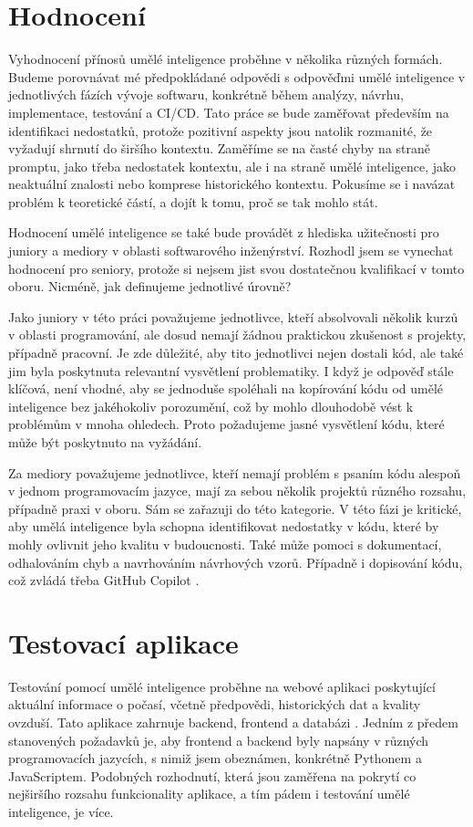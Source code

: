 \documentclass[FM,DP]{tulthesis}
\begin{document}
		\section{Hodnocení}
		Vyhodnocení přínosů umělé inteligence proběhne v několika různých formách. Budeme porovnávat mé předpokládané odpovědi s odpověďmi umělé inteligence v jednotlivých fázích vývoje softwaru, konkrétně během analýzy, návrhu, implementace, testování a CI/CD. Tato práce se bude zaměřovat především na identifikaci nedostatků, protože pozitivní aspekty jsou natolik rozmanité, že vyžadují shrnutí do širšího kontextu. Zaměříme se na časté chyby na straně promptu, jako třeba nedostatek kontextu, ale i na straně umělé inteligence, jako neaktuální znalosti nebo komprese historického kontextu. Pokusíme se i navázat problém k teoretické částí, a dojít k tomu, proč se tak mohlo stát.
		
		Hodnocení umělé inteligence se také bude provádět z hlediska užitečnosti pro juniory a mediory v oblasti softwarového inženýrství. Rozhodl jsem se vynechat hodnocení pro seniory, protože si nejsem jist svou dostatečnou kvalifikací v tomto oboru. Nicméně, jak definujeme jednotlivé úrovně?
		
		Jako juniory v této práci považujeme jednotlivce, kteří absolvovali několik kurzů v oblasti programování, ale dosud nemají žádnou praktickou zkušenost s projekty, případně pracovní. Je zde důležité, aby tito jednotlivci nejen dostali kód, ale také jim byla poskytnuta relevantní vysvětlení problematiky. I když je odpověď stále klíčová, není vhodné, aby se jednoduše spoléhali na kopírování kódu od umělé inteligence bez jakéhokoliv porozumění, což by mohlo dlouhodobě vést k problémům v mnoha ohledech. Proto požadujeme jasné vysvětlení kódu, které může být poskytnuto na vyžádání.
		
		Za mediory považujeme jednotlivce, kteří nemají problém s psaním kódu alespoň v jednom programovacím jazyce, mají za sebou několik projektů různého rozsahu, případně praxi v oboru. Sám se zařazuji do této kategorie. V této fázi je kritické, aby umělá inteligence byla schopna identifikovat nedostatky v kódu, které by mohly ovlivnit jeho kvalitu v budoucnosti. Také může pomoci s dokumentací, odhalováním chyb a navrhováním návrhových vzorů. Případně i  dopisování kódu, což zvládá třeba GitHub Copilot \cite{gitCopilot}.
		
		\section{Testovací aplikace}
		Testování pomocí umělé inteligence proběhne na webové aplikaci poskytující aktuální informace o počasí, včetně předpovědi, historických dat a kvality ovzduší. Tato aplikace zahrnuje backend, frontend a databázi \cite{webapp_basics}. Jedním z předem stanovených požadavků je, aby frontend a backend byly napsány v různých programovacích jazycích, s nimiž jsem obeznámen, konkrétně Pythonem a JavaScriptem. Podobných rozhodnutí, která jsou zaměřena na pokrytí co nejširšího rozsahu funkcionality aplikace, a tím pádem i testování umělé inteligence, je více.
		
\end{document}
